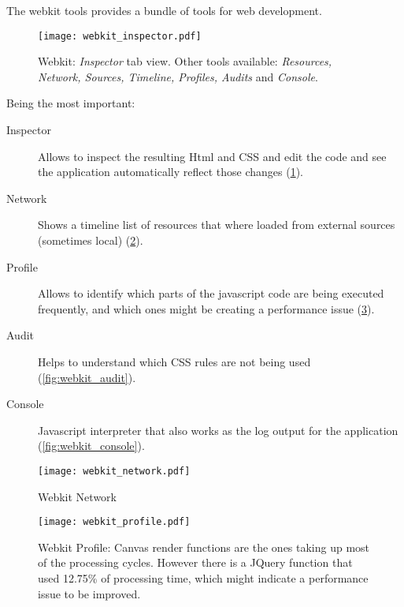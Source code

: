     The webkit tools provides a bundle of tools for web development.

    \begin{figure}
      \begin{center}
        \texttt{[image: webkit\_inspector.pdf]}
      \end{center}
      \caption{Webkit: \emph{Inspector} tab view. Other tools available: \emph{Resources, Network, Sources, Timeline, Profiles, Audits} and \emph{Console}.}

      \label{fig:webkit_inspector}
    \end{figure}

    Being the most important:

    \begin{description}
      \item[Inspector] Allows to inspect the resulting Html and CSS and edit the code and see the application automatically reflect those changes (\ref{fig:webkit_inspector}).
      \item[Network] Shows a timeline list of resources that where loaded from external sources (sometimes local) (\ref{fig:webkit_network}).
      \item[Profile] Allows to identify which parts of the javascript code are being executed frequently, and which ones might be creating a performance issue (\ref{fig:webkit_profile}).
      \item[Audit] Helps to understand which CSS rules are not being used (\ref{fig:webkit_audit}).
      \item[Console] Javascript interpreter that also works as the log output for the application (\ref{fig:webkit_console}).

    \end{description}

    \begin{figure}
      \begin{center}
        \texttt{[image: webkit\_network.pdf]}
      \end{center}
      \caption{Webkit Network}
      \label{fig:webkit_network}
    \end{figure}

    \begin{figure}
      \begin{center}
        \texttt{[image: webkit\_profile.pdf]}
      \end{center}
      \caption{Webkit Profile: Canvas render functions are the ones taking up most of the processing cycles. However there is a JQuery function that used 12.75\% of processing time, which might indicate a performance issue to be improved.}
      \label{fig:webkit_profile}
    \end{figure}

